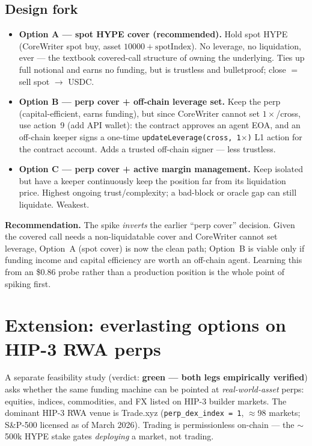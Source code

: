 \documentclass[11pt]{article}
\newcommand{\code}[1]{\texttt{\small #1}}
\begin{document}
\subsection{Design fork}
\begin{itemize}[leftmargin=1.4em,itemsep=3pt]
  \item \textbf{Option A --- spot HYPE cover (recommended).} Hold spot HYPE (CoreWriter spot buy,
        asset $10000+\text{spotIndex}$). No leverage, no liquidation, ever --- the textbook
        covered-call structure of owning the underlying. Ties up full notional and earns no funding,
        but is trustless and bulletproof; close $=$ sell spot $\to$ USDC.
  \item \textbf{Option B --- perp cover + off-chain leverage set.} Keep the perp (capital-efficient,
        earns funding), but since CoreWriter cannot set $1\times$/cross, use action~9 (add API
        wallet): the contract approves an agent EOA, and an off-chain keeper signs a one-time
        \code{updateLeverage(cross, 1$\times$)} L1 action for the contract account. Adds a trusted
        off-chain signer --- less trustless.
  \item \textbf{Option C --- perp cover + active margin management.} Keep isolated but have a keeper
        continuously keep the position far from its liquidation price. Highest ongoing
        trust/complexity; a bad-block or oracle gap can still liquidate. Weakest.
\end{itemize}
\textbf{Recommendation.} The spike \emph{inverts} the earlier ``perp cover'' decision. Given the
covered call needs a non-liquidatable cover and CoreWriter cannot set leverage, Option~A (spot
cover) is now the clean path; Option~B is viable only if funding income and capital efficiency are
worth an off-chain agent. Learning this from an \$0.86 probe rather than a production position is the
whole point of spiking first.

\section{Extension: everlasting options on HIP-3 RWA perps}\label{sec:hip3}

A separate feasibility study (verdict: \textbf{green --- both legs empirically verified}) asks whether
the same funding machine can be pointed at \emph{real-world-asset} perps: equities, indices,
commodities, and FX listed on HIP-3 builder markets. The dominant HIP-3 RWA venue is Trade.xyz
(\code{perp\_dex\_index = 1}, $\approx$98 markets; S\&P-500 licensed as of March 2026). Trading is
permissionless on-chain --- the $\sim$500k HYPE stake gates \emph{deploying} a market, not trading.
\end{document}
